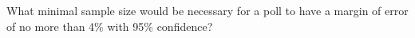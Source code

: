 What minimal sample size would be necessary for a poll to have a margin of error of no more than 4\% with 95\% confidence?